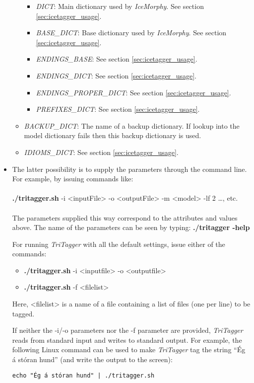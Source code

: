 \documentclass[11pt]{article}
\begin{document}
\begin{itemize}
\begin{itemize}
\begin{itemize}
\item \emph{DICT}: Main dictionary used by \emph{IceMorphy}. See section \ref{sec:icetagger_usage}.
\item \emph{BASE\_DICT}: Base dictionary used by \emph{IceMorphy}. See section \ref{sec:icetagger_usage}.
\item \emph{ENDINGS\_BASE}: See section \ref{sec:icetagger_usage}.
\item \emph{ENDINGS\_DICT}: See section \ref{sec:icetagger_usage}.
\item \emph{ENDINGS\_PROPER\_DICT}: See section \ref{sec:icetagger_usage}.
\item \emph{PREFIXES\_DICT}: See section \ref{sec:icetagger_usage}.
\end{itemize}
\item \emph{BACKUP\_DICT}: The name of a backup dictionary. If lookup into the model dictionary fails then this backup dictionary is used.
\item \emph{IDIOMS\_DICT}: See section \ref{sec:icetagger_usage}.
\end{itemize}
\item The latter possibility is to supply the parameters through the command line. For example, by issuing commands like: \\ \\
\textbf{./tritagger.sh} -i <inputFile> -o <outputFile> -m <model> -lf 2 \ldots, etc. \\ \\
The parameters supplied this way correspond to the attributes and values above.
The name of the parameters can be seen by typing: \textbf{./tritagger -help}

For running \textit{TriTagger} with all the default settings, issue either of the commands: 
\begin{itemize} 
\item \textbf{./tritagger.sh} -i <inputfile> -o <outputfile>
\item \textbf{./tritagger.sh} -f <filelist> 
\end{itemize}
Here, <filelist> is a name of a file containing a list of files (one per line) to be tagged.

If neither the -i/-o parameters nor the -f parameter are provided, \textit{TriTagger} reads from standard input and writes to standard output.
For example, the following Linux command can be used to make \textit{TriTagger} tag the string ``Ég á stóran hund'' (and write the output to the screen): 
\begin{verbatim}
echo "Ég á stóran hund" | ./tritagger.sh 
\end{verbatim}
\end{itemize}
\end{document}

